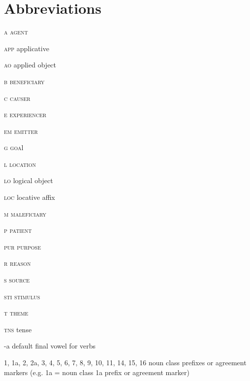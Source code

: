 \documentclass[output=paper]{langsci/langscibook}
\begin{document}
\section {Abbreviations}

\textsc{a} \textsc{agent}

\textsc{app} applicative

\textsc{ao} applied object 

\textsc{b} \textsc{beneficiary}

\textsc{c} \textsc{causer}

\textsc{e} \textsc{experiencer}

\textsc{em} \textsc{emitter}

\textsc{g} \textsc{goa}l

\textsc{l} \textsc{location}

\textsc{lo} logical object 

\textsc{loc} locative affix

\textsc{m} \textsc{maleficiary}

\textsc{p} \textsc{patient}

\textsc{pur }\textsc{purpose }

\textsc{r} \textsc{reason}

\textsc{s} \textsc{source}

\textsc{sti} \textsc{stimulus}

\textsc{t} \textsc{theme}

\textsc{tns} tense 

-a default final vowel for verbs

1, 1a, 2, 2a, 3, 4, 5, 6, 7, 8, 9, 10, 11, 14, 15, 16 noun class prefixes or agreement markers (e.g. 1a = noun class 1a prefix or agreement marker)
\end{document}
